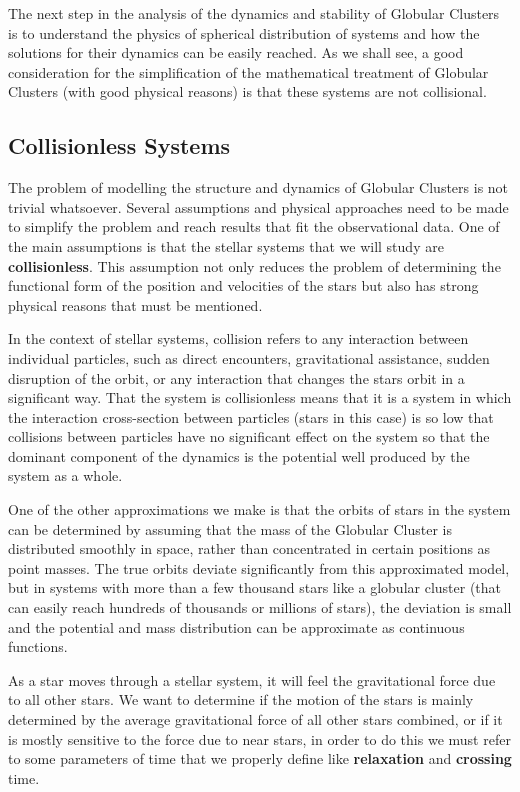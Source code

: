 The next step in the analysis of the dynamics and stability of Globular Clusters is to understand the physics of spherical distribution of systems and how the solutions for their dynamics can be easily reached. As we shall see, a good consideration for the simplification of the mathematical treatment of Globular Clusters (with good physical reasons) is that these systems are not collisional.

\subsection{Collisionless Systems}

The problem of modelling the structure and dynamics of Globular Clusters is not trivial whatsoever. Several assumptions and physical approaches need to be made to simplify the problem and reach results that fit the observational data. One of the main assumptions is that the stellar systems that we will study are \textbf{collisionless}. This assumption not only reduces the problem of determining the functional form of the position and velocities of the stars but also has strong physical reasons that must be mentioned.

In the context of stellar systems, collision refers to any interaction between individual particles, such as direct encounters, gravitational assistance, sudden disruption of the orbit, or any interaction that changes the stars orbit in a significant way. That the system is collisionless means that it is a system in which the interaction cross-section between particles (stars in this case) is so low that collisions between particles have no significant effect on the system so that the dominant component of the dynamics is the potential well produced by the system as a whole.  

One of the other approximations we make is that the orbits of stars in the system can be determined by assuming that the mass of the Globular Cluster is distributed smoothly in space, rather than concentrated in certain positions as point masses. The true orbits deviate significantly from this approximated model, but in systems with more than a few thousand stars like a globular cluster (that can easily reach hundreds of thousands or millions of stars), the deviation is small and the potential and mass distribution can be approximate as continuous functions. 

As a star moves through a stellar system, it will feel the gravitational force due to all other stars. We want to determine if the motion of the stars is mainly determined by the average gravitational force of all other stars combined, or if it is mostly sensitive to the force due to near stars, in order to do this we must refer to some parameters of time that we properly define like \textbf{relaxation} and \textbf{crossing} time. 

